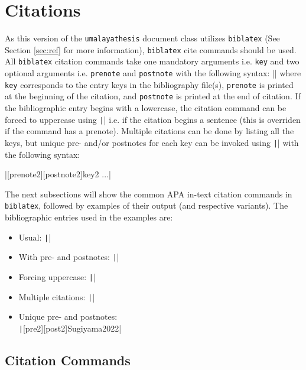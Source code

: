 \documentclass{umalayathesis}
\begin{document}
\section{Citations}

As this version of the \texttt{umalayathesis} document class utilizes \texttt{biblatex} (See Section \ref{sec:ref} for more information), \texttt{biblatex} cite commands should be used. All \texttt{biblatex} citation commands take one mandatory arguments i.e. \texttt{key} and two optional arguments i.e. \texttt{prenote} and \texttt{postnote} with the following syntax:
||
where \texttt{key} corresponds to the entry keys in the bibliography file(s), \texttt{prenote} is printed at the beginning of the citation, and \texttt{postnote} is printed at the end of citation. If the bibliographic entry begins with a lowercase, the citation command can be forced to uppercase using \texttt|\Command| i.e. if the citation begins a sentence (this is overriden if the command has a prenote). Multiple citations can be done by listing all the keys, but unique pre- and/or postnotes for each key can be invoked using \texttt|\commands| with the following syntax:

|[prenote2][postnote2]{key2} ...|

The next subsections will show the common APA in-text citation commands in \texttt{biblatex}, followed by examples of their output (and respective variants). The bibliographic entries used in the examples are:
\begin{itemize}
    \item Usual: \texttt||
    \item With pre- and postnotes: \texttt||
    \item Forcing uppercase: \texttt||
    \item Multiple citations: \texttt||
    \item Unique pre- and postnotes: \\ \texttt|[pre2][post2]{Sugiyama2022}|
\end{itemize}

\subsection{Citation Commands}
\end{document}
